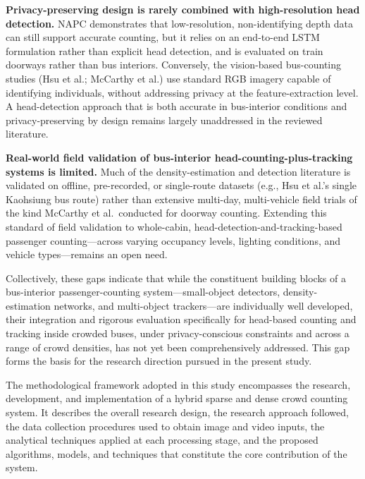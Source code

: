 \documentclass[12pt,a4paper]{report}
\begin{document}
\textbf{Privacy-preserving design is rarely combined with high-resolution head detection.}
NAPC demonstrates that low-resolution, non-identifying depth data can still support accurate counting, but it relies on an end-to-end LSTM formulation rather than explicit head detection, and is evaluated on train doorways rather than bus interiors. Conversely, the vision-based bus-counting studies (Hsu et al.; McCarthy et al.) use standard RGB imagery capable of identifying individuals, without addressing privacy at the feature-extraction level. A head-detection approach that is both accurate in bus-interior conditions and privacy-preserving by design remains largely unaddressed in the reviewed literature.

\textbf{Real-world field validation of bus-interior head-counting-plus-tracking systems is limited.}
Much of the density-estimation and detection literature is validated on offline, pre-recorded, or single-route datasets (e.g., Hsu et al.'s single Kaohsiung bus route) rather than extensive multi-day, multi-vehicle field trials of the kind McCarthy et al.\ conducted for doorway counting. Extending this standard of field validation to whole-cabin, head-detection-and-tracking-based passenger counting---across varying occupancy levels, lighting conditions, and vehicle types---remains an open need.

Collectively, these gaps indicate that while the constituent building blocks of a bus-interior passenger-counting system---small-object detectors, density-estimation networks, and multi-object trackers---are individually well developed, their integration and rigorous evaluation specifically for head-based counting and tracking inside crowded buses, under privacy-conscious constraints and across a range of crowd densities, has not yet been comprehensively addressed. This gap forms the basis for the research direction pursued in the present study.


The methodological framework adopted in this study encompasses the research, development, and implementation of a hybrid sparse and dense 
crowd counting system. It describes the overall research design, the research approach followed, the data collection procedures used to obtain image and video inputs, the analytical techniques applied at each processing stage, and the proposed algorithms, models, and techniques that constitute the core contribution of the system. 
\end{document}
